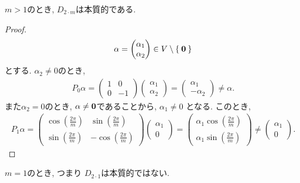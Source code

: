 \begin{prop}
$m>1$のとき, $D_{2\cdot m}$は本質的である.
\end{prop}
\begin{proof}
  \begin{align*}
    \alpha=\begin{pmatrix}
      \alpha_1 \\
      \alpha_2
    \end{pmatrix}\in V\setminus\Set{\boldsymbol{0}}
  \end{align*}
  とする.
  $\alpha_2\neq 0$のとき,
  \begin{align*}
    P_0 \alpha =
    \begin{pmatrix}
      1&0\\
      0&-1
    \end{pmatrix}  
    \begin{pmatrix}
      \alpha_1\\
      \alpha_2
    \end{pmatrix}
    =
    \begin{pmatrix}
      \alpha_1\\
      -\alpha_2
    \end{pmatrix}
    \neq \alpha.
  \end{align*}
  また$\alpha_2=0$のとき,
  $\alpha\neq \boldsymbol{0}$であることから,
  $\alpha_1\neq 0$ となる.
  このとき,
  \begin{align*}
    P_1 \alpha =
    \begin{pmatrix}
      \cos(\frac{2\pi}{m})&\sin(\frac{2\pi}{m})\\
      \sin(\frac{2\pi}{m})&-\cos(\frac{2\pi}{m})
    \end{pmatrix}  
    \begin{pmatrix}
      \alpha_1\\
      0
    \end{pmatrix}
    =
    \begin{pmatrix}
      \alpha_1\cos(\frac{2\pi}{m})\\
      \alpha_1\sin(\frac{2\pi}{m})
    \end{pmatrix}  
    \neq
    \begin{pmatrix}
      \alpha_1\\
      0
    \end{pmatrix}
    .
  \end{align*}
\end{proof}
\begin{prop}
  $m=1$のとき, つまり $D_{2\cdot 1}$は本質的ではない.
\end{prop}

